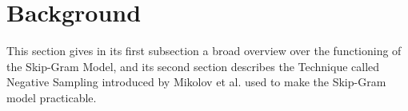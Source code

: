
\section{Background}\label{sec:background}

This section gives in its first subsection a broad overview over the functioning of the Skip-Gram Model, and its second section describes the Technique called Negative Sampling introduced by Mikolov et al. \cite{mikolov2} used to make the Skip-Gram model practicable.
